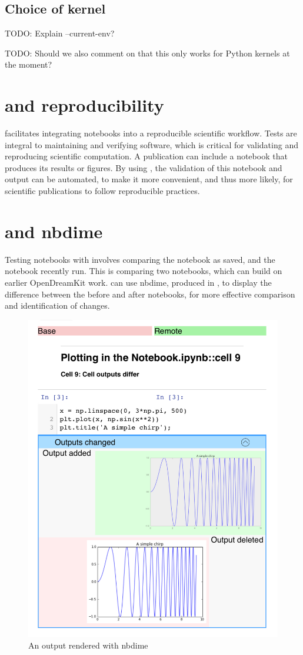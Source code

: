 \documentclass{deliverablereport}
\begin{document}
\subsection{Choice of kernel}
TODO: Explain --current-env?

TODO: Should we also comment on that this only works for Python
kernels at the moment?


\section{\nbval and reproducibility} %

\nbval facilitates integrating notebooks into a reproducible
scientific workflow.  Tests are integral to maintaining and verifying
software, which is critical for validating and reproducing scientific
computation.  A publication can include a notebook that produces its
results or figures.  By using \nbval, the validation of this notebook
and output can be automated, to make it more convenient, and thus more
likely, for scientific publications to follow reproducible practices.


\section{\nbval and nbdime} %

Testing notebooks with \nbval involves comparing the notebook as saved,
and the notebook recently run.
This is comparing two notebooks,
which can build on earlier OpenDreamKit work.
\nbval can use nbdime, produced in ,
to display the difference between the before and after notebooks,
for more effective comparison and identification of changes.

\begin{figure}[ht]
  \centering
  \includegraphics[width=.7\textwidth]{img/nbval-nbdime}
  \caption{An \nbval output rendered with nbdime}\label{fig:nbval-nbdime}
\end{figure}
\end{document}
